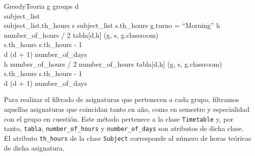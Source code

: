 \begin{pseudocode}{GreedyTeoria}{ }
    \label{greedyteoria}
    \FOREACH g \in groups \DO
    \BEGIN
        d  \\
        subject\_list \GETS {}\\
        \WHILE \sum subject\_list.th\_hours  \DO
        \BEGIN
            \FOREACH s \in subject\_list \DO
            \BEGIN
                \IF s.th\_hours  \DO
                \BEGIN
                    \IF g.turno = ``Morning'' \DO
                    \BEGIN
                        \FOR h  \TO number\_of\_hours / 2 \DO
                        \BEGIN
                            \IF {} \DO
                            \BEGIN
                                tabla[d,h] \GETS (g, s, g.classroom)\\
                                s.th\_hours \GETS s.th\_hours - 1\\
                                d \GETS (d + 1) \bmod number\_of\_days\\
                                \BREAK
                            \END
                        \END
                    \END
                    \ELSE \DO
                    \BEGIN
                        \FOR h \GETS number\_of\_hours / 2 \TO number\_of\_hours \DO
                        \BEGIN
                            \IF {} \DO
                            \BEGIN
                                tabla[d,h] \GETS (g, s, g.classroom)\\
                                s.th\_hours \GETS s.th\_hours - 1\\
                                d \GETS (d + 1) \bmod number\_of\_days\\
                                \BREAK
                            \END
                        \END
                    \END
                \END
            \END
        \END
    \END
\end{pseudocode}

Para realizar el filtrado de asignaturas que pertenecen a cada grupo, filtramos aquellas asignaturas que coincidan tanto en año, como en semestre y especialidad con el grupo en cuestión. Este método pertenece a la clase \texttt{Timetable} y, por tanto, \texttt{tabla}, \texttt{number\_of\_hours} y \texttt{number\_of\_days} son atributos de dicha clase. El atributo \texttt{th\_hours} de la clase \texttt{Subject} corresponde al número de horas teóricas de dicha asignatura.

